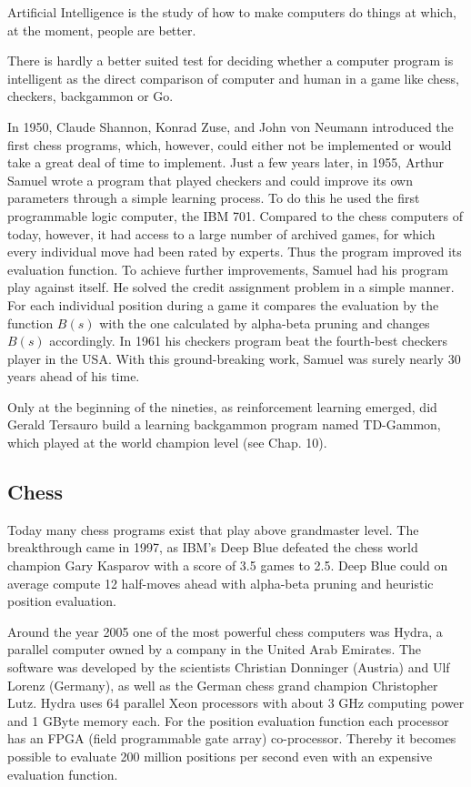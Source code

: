 \documentclass[10pt]{book}
\begin{document}
Artificial Intelligence is the study of how to make computers do things at which, at the moment, people are better.

There is hardly a better suited test for deciding whether a computer program is intelligent as the direct comparison of computer and human in a game like chess, checkers, backgammon or Go.

In 1950, Claude Shannon, Konrad Zuse, and John von Neumann introduced the first chess programs, which, however, could either not be implemented or would take a great deal of time to implement. Just a few years later, in 1955, Arthur Samuel wrote a program that played checkers and could improve its own parameters through a simple learning process. To do this he used the first programmable logic computer, the IBM 701. Compared to the chess computers of today, however, it had access to a large number of archived games, for which every individual move had been rated by experts. Thus the program improved its evaluation function. To achieve further improvements, Samuel had his program play against itself. He solved the credit assignment problem in a simple manner. For each individual position during a game it compares the evaluation by the function $B(s)$ with the one calculated by alpha-beta pruning and changes $B(s)$ accordingly. In 1961 his checkers program beat the fourth-best checkers player in the USA. With this ground-breaking work, Samuel was surely nearly 30 years ahead of his time.

Only at the beginning of the nineties, as reinforcement learning emerged, did Gerald Tersauro build a learning backgammon program named TD-Gammon, which played at the world champion level (see Chap. 10).

\subsection{Chess}
Today many chess programs exist that play above grandmaster level. The breakthrough came in 1997, as IBM's Deep Blue defeated the chess world champion Gary Kasparov with a score of 3.5 games to 2.5. Deep Blue could on average compute 12 half-moves ahead with alpha-beta pruning and heuristic position evaluation.

Around the year 2005 one of the most powerful chess computers was Hydra, a parallel computer owned by a company in the United Arab Emirates. The software was developed by the scientists Christian Donninger (Austria) and Ulf Lorenz (Germany), as well as the German chess grand champion Christopher Lutz. Hydra uses 64 parallel Xeon processors with about 3 GHz computing power and 1 GByte memory each. For the position evaluation function each processor has an FPGA (field programmable gate array) co-processor. Thereby it becomes possible to evaluate 200 million positions per second even with an expensive evaluation function.
\end{document}

